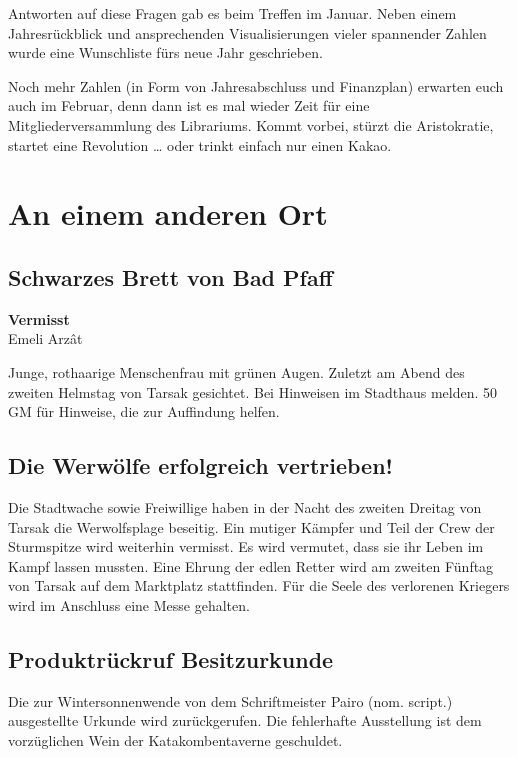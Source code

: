 Antworten auf diese Fragen gab es beim Treffen im Januar.
Neben einem Jahresrückblick und ansprechenden Visualisierungen vieler spannender Zahlen wurde eine Wunschliste fürs neue Jahr geschrieben.

Noch mehr Zahlen (in Form von Jahresabschluss und Finanzplan) erwarten euch auch im Februar, denn dann ist es mal wieder Zeit für eine Mitgliederversammlung des Librariums.
Kommt vorbei, stürzt die Aristokratie, startet eine Revolution … oder trinkt einfach nur einen Kakao.


\section{An einem anderen Ort}
\setsubsubsecheadstyle{\centering\bfseries}

\subsection{Schwarzes Brett von Bad Pfaff}
\begin{center}
    \textbf{Vermisst} \\
    Emeli Arzât
\end{center}
\vspace{-1.5em}
\noindent
Junge, rothaarige Menschenfrau mit grünen Augen.
Zuletzt am Abend des zweiten Helmstag von Tarsak gesichtet.
Bei Hinweisen im Stadthaus melden.
50 GM für Hinweise, die zur Auffindung helfen.


\subsection{Die Werwölfe erfolgreich vertrieben!}

Die Stadtwache sowie Freiwillige haben in der Nacht des zweiten Dreitag von Tarsak die Werwolfsplage beseitig. 
Ein mutiger Kämpfer und Teil der Crew der Sturmspitze wird weiterhin vermisst. 
Es wird vermutet, dass sie ihr Leben im Kampf lassen mussten.
Eine Ehrung der edlen Retter wird am zweiten Fünftag von Tarsak auf dem Marktplatz stattfinden. Für die Seele des verlorenen Kriegers wird im Anschluss eine Messe gehalten.


\subsection{Produktrückruf Besitzurkunde}
Die zur Wintersonnenwende von dem Schriftmeister Pairo (nom. script.) ausgestellte Urkunde wird zurückgerufen.
Die fehlerhafte Ausstellung ist dem vorzüglichen Wein der Katakombentaverne geschuldet.

